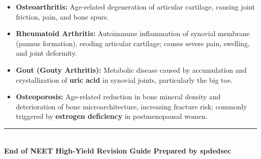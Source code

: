 \documentclass[11pt,a4paper]{article}
\begin{document}
\begin{itemize}[leftmargin=1.5em, itemsep=2pt]
\begin{itemize}[label=$\circ$]
    \item \textbf{Osteoarthritis:} Age-related degeneration of articular cartilage, causing joint friction, pain, and bone spurs.
    \item \textbf{Rheumatoid Arthritis:} Autoimmune inflammation of synovial membrane (pannus formation), eroding articular cartilage; causes severe pain, swelling, and joint deformity.
    \item \textbf{Gout (Gouty Arthritis):} Metabolic disease caused by accumulation and crystallization of \textbf{uric acid} in synovial joints, particularly the big toe.
    \item \textbf{Osteoporosis:} Age-related reduction in bone mineral density and deterioration of bone microarchitecture, increasing fracture risk; commonly triggered by \textbf{estrogen deficiency} in postmenopausal women.
  \end{itemize}
\end{itemize}

\vfill
\begin{center}
  \rule{0.6\textwidth}{0.5pt}\\[6pt]
  {\small\bfseries\color{primaryteal} End of NEET High-Yield Revision Guide \quad\textbar\quad Prepared by spdedsec}
\end{center}
\end{document}
